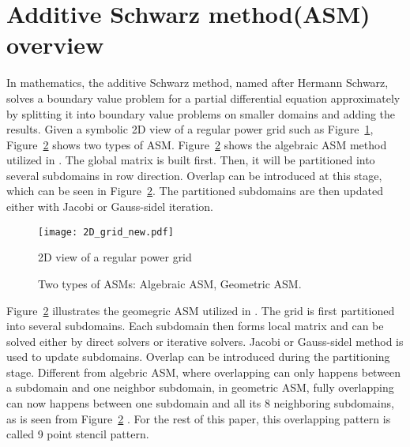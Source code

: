 \documentclass{sig-alternate}
\begin{document}
\section{Additive Schwarz method(ASM) overview}	
	In mathematics, the additive Schwarz method, named after Hermann Schwarz, solves a boundary value problem for a partial 
	differential equation approximately by splitting it into boundary value problems on smaller domains and adding the results.
	Given a symbolic 2D view of a regular power grid such as Figure~\ref{Fig1}, Figure~\ref{Fig2} shows two types of ASM. 
	Figure~\ref{Fig2} shows the algebraic ASM method utilized in \cite{kaisun}. The global matrix is built first. 
	Then, it will be partitioned into several subdomains in row direction. 
	Overlap can be introduced at this stage, which can be seen in Figure~\ref{Fig2}. The partitioned subdomains
	are then updated either with Jacobi or Gauss-sidel iteration.\\
	\begin{figure}[htbp]
	  \centering
	  \texttt{[image: 2D\_grid\_new.pdf]}
	  \caption{2D view of a regular power grid}
	  \label{Fig1}
	\end{figure}
	
	\begin{figure}[htbp]
	  \caption{Two types of ASMs: 
	   Algebraic ASM,
	   Geometric ASM.}
	  \label{Fig2}
	\end{figure}

	Figure~\ref{Fig2} illustrates the geomegric ASM utilized in \cite{Zhongyu}. The grid is first partitioned
	into several subdomains. Each subdomain then forms local matrix and can be solved either by direct solvers or iterative solvers. 
	Jacobi or Gauss-sidel method is used to update subdomains. Overlap can be introduced during the partitioning stage.
	Different from algebric ASM, where overlapping can only happens between a subdomain and one neighbor subdomain, in geometric ASM, 
	fully overlapping can now happens between one subdomain and all its 8 neighboring subdomains, as is seen from Figure~\ref{Fig2}
	. For the rest of this paper, this overlapping pattern is called 9 point stencil pattern.\\
	
\end{document}
